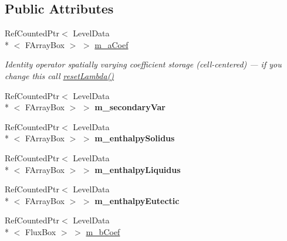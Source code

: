 \subsection*{Public Attributes}
\begin{DoxyCompactItemize}
\item 
\hypertarget{class_a_m_r_liquid_conc_op_ab73e01a33f2711f8cd0c8eaa2150d52f}{Ref\-Counted\-Ptr$<$ Level\-Data\\*
$<$ F\-Array\-Box $>$ $>$ \hyperlink{class_a_m_r_liquid_conc_op_ab73e01a33f2711f8cd0c8eaa2150d52f}{m\-\_\-a\-Coef}}\label{class_a_m_r_liquid_conc_op_ab73e01a33f2711f8cd0c8eaa2150d52f}

\begin{DoxyCompactList}\small\item\em Identity operator spatially varying coefficient storage (cell-\/centered) --- if you change this call \hyperlink{class_a_m_r_liquid_conc_op_a7db78d52b946b8706d83328f5f49f3e1}{reset\-Lambda()} \end{DoxyCompactList}\item 
\hypertarget{class_a_m_r_liquid_conc_op_a9d953995393ffe739512efd06d8aaf51}{Ref\-Counted\-Ptr$<$ Level\-Data\\*
$<$ F\-Array\-Box $>$ $>$ {\bfseries m\-\_\-secondary\-Var}}\label{class_a_m_r_liquid_conc_op_a9d953995393ffe739512efd06d8aaf51}

\item 
\hypertarget{class_a_m_r_liquid_conc_op_a3eb3feb87ef2f36fa0098bc701873572}{Ref\-Counted\-Ptr$<$ Level\-Data\\*
$<$ F\-Array\-Box $>$ $>$ {\bfseries m\-\_\-enthalpy\-Solidus}}\label{class_a_m_r_liquid_conc_op_a3eb3feb87ef2f36fa0098bc701873572}

\item 
\hypertarget{class_a_m_r_liquid_conc_op_ad6852451935d45e710e120fe5699a3ba}{Ref\-Counted\-Ptr$<$ Level\-Data\\*
$<$ F\-Array\-Box $>$ $>$ {\bfseries m\-\_\-enthalpy\-Liquidus}}\label{class_a_m_r_liquid_conc_op_ad6852451935d45e710e120fe5699a3ba}

\item 
\hypertarget{class_a_m_r_liquid_conc_op_a1cafdbdfdec8cad1eba4d61fd696fc43}{Ref\-Counted\-Ptr$<$ Level\-Data\\*
$<$ F\-Array\-Box $>$ $>$ {\bfseries m\-\_\-enthalpy\-Eutectic}}\label{class_a_m_r_liquid_conc_op_a1cafdbdfdec8cad1eba4d61fd696fc43}

\item 
\hypertarget{class_a_m_r_liquid_conc_op_aa62dedbbea7970d8813382c923575e20}{Ref\-Counted\-Ptr$<$ Level\-Data\\*
$<$ Flux\-Box $>$ $>$ \hyperlink{class_a_m_r_liquid_conc_op_aa62dedbbea7970d8813382c923575e20}{m\-\_\-b\-Coef}}\label{class_a_m_r_liquid_conc_op_aa62dedbbea7970d8813382c923575e20}


\end{DoxyCompactItemize}

